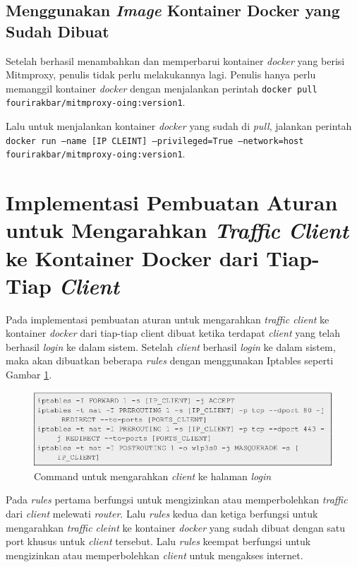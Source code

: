 \subsection{Menggunakan \textit{Image} Kontainer Docker yang Sudah Dibuat}
Setelah berhasil menambahkan dan memperbarui kontainer \textit{docker} yang berisi Mitmproxy, penulis tidak perlu melakukannya lagi. Penulis hanya perlu memanggil kontainer \textit{docker} dengan menjalankan perintah \texttt{docker pull fourirakbar/mitmproxy-oing:version1}.

Lalu untuk menjalankan kontainer \textit{docker} yang sudah di \textit{pull}, jalankan perintah \texttt{docker run --name [IP CLEINT] --privileged=True --network=host fourirakbar/mitmproxy-oing:version1}.

\section{Implementasi Pembuatan Aturan untuk Mengarahkan \textit{Traffic Client} ke Kontainer Docker dari Tiap-Tiap \textit{Client}}
Pada implementasi pembuatan aturan untuk mengarahkan \textit{traffic client} ke kontainer \textit{docker} dari tiap-tiap client dibuat ketika terdapat \textit{client} yang telah berhasil \textit{login} ke dalam sistem. Setelah \textit{client} berhasil \textit{login} ke dalam sistem, maka akan dibuatkan beberapa \textit{rules} dengan menggunakan Iptables seperti Gambar \ref{iptablesafterlogin}.
\begin{figure}[H]
	\centering
	\includegraphics[width=\linewidth]{images/bab4/iptablesafterlogin}
	\caption{Command untuk mengarahkan \textit{client} ke halaman \textit{login}}
	\label{iptablesafterlogin}
\end{figure}

Pada \textit{rules} pertama berfungsi untuk mengizinkan atau memperbolehkan \textit{traffic} dari \textit{client} melewati \textit{router}. Lalu \textit{rules} kedua dan ketiga berfungsi untuk mengarahkan \textit{traffic cleint} ke kontainer \textit{docker} yang sudah dibuat dengan satu port khusus untuk \textit{client} tersebut. Lalu \textit{rules} keempat berfungsi untuk mengizinkan atau memperbolehkan \textit{client} untuk mengakses internet.


